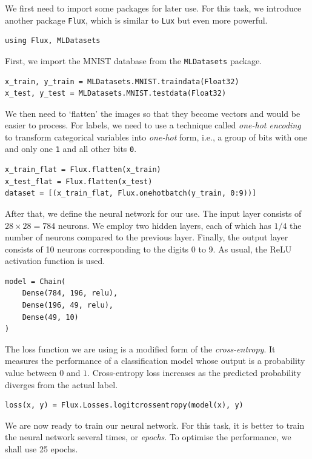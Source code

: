 \documentclass[a4paper,11pt, titlepage]{article}
\theoremstyle{definition}
\theoremstyle{plain}
\theoremstyle{remark}
\begin{document}
We first need to import some packages for later use. For this task, we introduce another package \verb|Flux|, which is similar to \verb|Lux| but even more powerful. 

\begin{verbatim}
using Flux, MLDatasets
\end{verbatim}

First, we import the MNIST database from the \verb|MLDatasets| package.

\begin{verbatim}
x_train, y_train = MLDatasets.MNIST.traindata(Float32)
x_test, y_test = MLDatasets.MNIST.testdata(Float32)
\end{verbatim}

We then need to ‘flatten’ the images so that they become vectors and would be easier to process. For labels, we need to use a technique called \textit{one-hot encoding} to transform categorical variables into \textit{one-hot} form, i.e., a group of bits with one and only one \verb|1| and all other bits \verb|0|.

\begin{verbatim}
x_train_flat = Flux.flatten(x_train)
x_test_flat = Flux.flatten(x_test)
dataset = [(x_train_flat, Flux.onehotbatch(y_train, 0:9))]
\end{verbatim}

After that, we define the neural network for our use. The input layer consists of $28\times 28 = 784$ neurons. We employ two hidden layers, each of which has $1/4$ the number of neurons compared to the previous layer. Finally, the output layer consists of 10 neurons corresponding to the digits 0 to 9. As usual, the ReLU activation function is used.

\begin{verbatim}
model = Chain(
    Dense(784, 196, relu),
    Dense(196, 49, relu),
    Dense(49, 10)
)
\end{verbatim}

The loss function we are using is a modified form of the \textit{cross-entropy}. It measures the performance of a classification model whose output is a probability value between $0$ and $1$. Cross-entropy loss increases as the predicted probability diverges from the actual label.

\begin{verbatim}
loss(x, y) = Flux.Losses.logitcrossentropy(model(x), y)
\end{verbatim}

We are now ready to train our neural network. For this task, it is better to train the neural network several times, or \textit{epochs}. To optimise the performance, we shall use 25 epochs.
\end{document}
